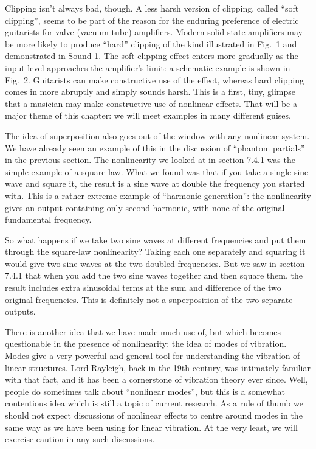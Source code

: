   Clipping isn’t always bad, though. A less harsh version of clipping, called 
  “soft clipping”, seems to be part of the reason for the enduring preference 
  of electric guitarists for valve (vacuum tube) amplifiers. Modern solid-state 
  amplifiers may be more likely to produce “hard” clipping of the kind 
  illustrated in Fig.\ 1 and demonstrated in Sound 1. The soft clipping effect 
  enters more gradually as the input level approaches the amplifier's limit: a 
  schematic example is shown in Fig.\ 2. Guitarists can make constructive use 
  of the effect, whereas hard clipping comes in more abruptly and simply sounds 
  harsh. This is a first, tiny, glimpse that a musician may make constructive 
  use of nonlinear effects. That will be a major theme of this chapter: we will 
  meet examples in many different guises. 


  The idea of superposition also goes out of the window with any nonlinear 
  system. We have already seen an example of this in the discussion of “phantom 
  partials” in the previous section. The nonlinearity we looked at in section 
  7.4.1 was the simple example of a square law. What we found was that if you 
  take a single sine wave and square it, the result is a sine wave at double 
  the frequency you started with. This is a rather extreme example of 
  ``harmonic generation'': the nonlinearity gives an output containing only 
  second harmonic, with none of the original fundamental frequency. 

  So what happens if we take two sine waves at different frequencies and put 
  them through the square-law nonlinearity? Taking each one separately and 
  squaring it would give two sine waves at the two doubled frequencies. But we 
  saw in section 7.4.1 that when you add the two sine waves together and then 
  square them, the result includes extra sinusoidal terms at the sum and 
  difference of the two original frequencies. This is definitely not a 
  superposition of the two separate outputs. 

  There is another idea that we have made much use of, but which becomes 
  questionable in the presence of nonlinearity: the idea of modes of vibration. 
  Modes give a very powerful and general tool for understanding the vibration 
  of linear structures. Lord Rayleigh, back in the 19th century, was intimately 
  familiar with that fact, and it has been a cornerstone of vibration theory 
  ever since. Well, people do sometimes talk about “nonlinear modes”, but this 
  is a somewhat contentious idea which is still a topic of current research. As 
  a rule of thumb we should not expect discussions of nonlinear effects to 
  centre around modes in the same way as we have been using for linear 
  vibration. At the very least, we will exercise caution in any such 
  discussions. 

